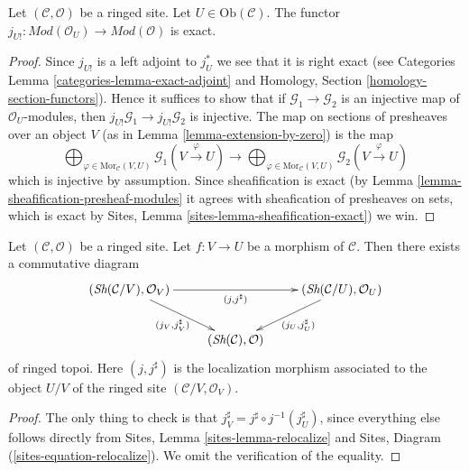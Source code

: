 \begin{lemma}
\label{lemma-extension-by-zero-exact}
Let $(\mathcal{C}, \mathcal{O})$ be a ringed site.
Let $U \in \text{Ob}(\mathcal{C})$.
The functor
$j_{U!} : \textit{Mod}(\mathcal{O}_U) \to \textit{Mod}(\mathcal{O})$
is exact.
\end{lemma}

\begin{proof}
Since $j_{U!}$ is a left adjoint to $j_U^*$ we see that it is right exact
(see Categories Lemma \ref{categories-lemma-exact-adjoint}
and Homology, Section \ref{homology-section-functors}).
Hence it suffices to show that if $\mathcal{G}_1 \to \mathcal{G}_2$
is an injective map of $\mathcal{O}_U$-modules, then
$j_{U!}\mathcal{G}_1 \to j_{U!}\mathcal{G}_2$ is injective.
The map on sections of presheaves over an object $V$
(as in Lemma \ref{lemma-extension-by-zero}) is the map
$$
\bigoplus\nolimits_{\varphi \in \text{Mor}_{\mathcal{C}}(V, U)}
\mathcal{G}_1(V \xrightarrow{\varphi} U)
\longrightarrow
\bigoplus\nolimits_{\varphi \in \text{Mor}_{\mathcal{C}}(V, U)}
\mathcal{G}_2(V \xrightarrow{\varphi} U)
$$
which is injective by assumption. Since sheafification is exact (by
Lemma \ref{lemma-sheafification-presheaf-modules}
it agrees with sheafication of presheaves on sets, which is exact
by Sites, Lemma \ref{sites-lemma-sheafification-exact}) we win.
\end{proof}

\begin{lemma}
\label{lemma-relocalize}
Let $(\mathcal{C}, \mathcal{O})$ be a ringed site.
Let $f : V \to U$ be a morphism of $\mathcal{C}$.
Then there exists a commutative diagram
$$
\xymatrix{
(\textit{Sh}(\mathcal{C}/V), \mathcal{O}_V)
\ar[rd]_{(j_V, j_V^\sharp)} \ar[rr]_{(j, j^\sharp)} & &
(\textit{Sh}(\mathcal{C}/U), \mathcal{O}_U)
\ar[ld]^{(j_U, j_U^\sharp)} \\
& (\textit{Sh}(\mathcal{C}), \mathcal{O}) &
}
$$
of ringed topoi. Here $(j, j^\sharp)$ is the localization morphism
associated to the object $U/V$ of the ringed site
$(\mathcal{C}/V, \mathcal{O}_V)$.
\end{lemma}

\begin{proof}
The only thing to check is that
$j_V^\sharp = j^\sharp \circ j^{-1}(j_U^\sharp)$,
since everything else follows directly from
Sites, Lemma \ref{sites-lemma-relocalize} and
Sites, Diagram (\ref{sites-equation-relocalize}).
We omit the verification of the equality.
\end{proof}

